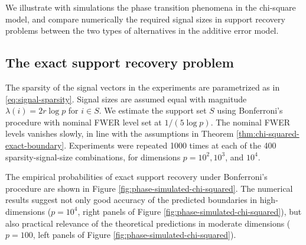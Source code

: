 

We illustrate with simulations the phase transition phenomena in the chi-square model, and compare numerically the required signal sizes in support recovery problems between the two types of alternatives in the additive error model.

\subsection{The exact support recovery problem}

The sparsity of the signal vectors in the experiments are parametrized as in \eqref{eq:signal-sparsity}. 
Signal sizes are assumed equal with magnitude $\lambda(i)=2r\log{p}$ for $i\in S$.
We estimate the support set $S$ using Bonferroni's procedure with nominal FWER level set at $1/(5{\log{p}})$.
The nominal FWER levels vanishes slowly, in line with the assumptions in Theorem \ref{thm:chi-squared-exact-boundary}.
Experiments were repeated 1000 times at each of the 400 sparsity-signal-size combinations, for dimensions $p=10^2, 10^3$, and $10^4$.

The empirical probabilities of exact support recovery under Bonferroni's procedure are shown in Figure \ref{fig:phase-simulated-chi-squared}.
The numerical results suggest not only good accuracy of the predicted boundaries in high-dimensions ($p=10^4$, right panels of Figure \ref{fig:phase-simulated-chi-squared}), but also practical relevance of the theoretical predictions in moderate dimensions ($p=100$, left panels of Figure \ref{fig:phase-simulated-chi-squared}).

